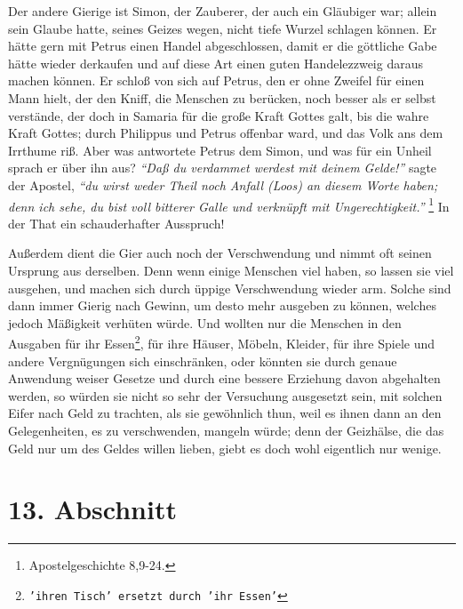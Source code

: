 Der andere Gierige ist Simon, der Zauberer, der auch ein Gläubiger war; allein
sein Glaube hatte, seines Geizes wegen, nicht tiefe Wurzel schlagen können. Er
hätte gern mit Petrus einen Handel abgeschlossen, damit er die göttliche Gabe
hätte wieder derkaufen und auf diese Art einen guten Handelezzweig daraus machen
können. Er schloß von sich auf Petrus, den er ohne Zweifel für einen Mann hielt,
der den Kniff, die Menschen zu berücken, noch besser als er selbst verstände,
der doch in Samaria für die große Kraft Gottes galt, bis die wahre Kraft Gottes;
durch Philippus und Petrus offenbar ward, und das Volk ans dem Irrthume riß.
Aber was antwortete Petrus dem Simon, und was für ein Unheil sprach er über ihn
aus? \textit{"`Daß du verdammet werdest mit deinem Gelde!"'} sagte der Apostel, \textit{"`du wirst
weder Theil noch Anfall (Loos) an diesem Worte haben; denn ich sehe, du bist
voll bitterer Galle und verknüpft mit Ungerechtigkeit."'}
\footnote{Apostelgeschichte 8,9-24.}
In der That ein schauderhafter Ausspruch!

\medskip

Außerdem dient die Gier auch noch der Verschwendung und nimmt oft seinen
Ursprung aus derselben. Denn wenn einige Menschen viel haben, so lassen sie viel
ausgehen, und machen sich durch üppige Verschwendung wieder arm. Solche sind
dann immer Gierig nach Gewinn, um desto mehr ausgeben zu können, welches jedoch
Mäßigkeit verhüten würde. Und wollten nur die Menschen in den Ausgaben für ihr Essen\footnote{\texttt{'ihren Tisch' ersetzt durch 'ihr Essen'}}, für ihre Häuser, Möbeln, Kleider, für ihre Spiele und andere Vergnügungen
sich einschränken, oder könnten sie durch genaue Anwendung weiser Gesetze und
durch eine bessere Erziehung davon abgehalten werden, so würden sie nicht so
sehr der Versuchung ausgesetzt sein, mit solchen Eifer nach Geld zu trachten,
als sie gewöhnlich thun, weil es ihnen dann an den Gelegenheiten, es zu
verschwenden, mangeln würde; denn der Geizhälse, die das Geld nur um des Geldes
willen lieben, giebt es doch wohl eigentlich nur wenige.

\section{13. Abschnitt} \label{kap13_ab13}

